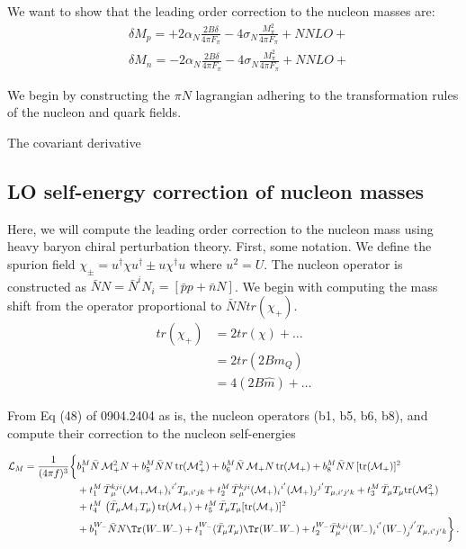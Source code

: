 \documentclass[12pt,tightenlines, raggedbottom, prd, notitlepage]{revtex4-1}
\def\mc#1{{\mathcal #1}}
\def\tr{\text{tr}}
\begin{document}
We want to show that the leading order correction to the nucleon masses are:
\begin{align*}
 &\delta M_p =  +2\alpha_N \frac{2B\delta}{4\pi F_\pi} - 4\sigma_N \frac{M^2_\pi}{4\pi F_\pi} + NNLO+ \\
 &\delta M_n = -2\alpha_N \frac{2B\delta}{4\pi F_\pi} - 4\sigma_N \frac{M^2_\pi}{4\pi F_\pi} + NNLO+
\end{align*}

We begin by constructing the $\pi N$ lagrangian adhering to the transformation rules
of the nucleon and quark fields. 

The covariant derivative 




\subsection*{LO self-energy correction of nucleon masses}

Here, we will compute the leading order correction to the nucleon mass using heavy baryon chiral perturbation theory. First, some notation. We define the spurion field $\chi_{\pm} = u^{\dagger}\chi u^{\dagger} \pm u\chi^{\dagger}u$ where $u^2 = U$.
The nucleon operator is constructed as $\bar{N}N = \bar{N}^iN_i = [\bar{p}p + \bar{n}N]$. We begin with computing the mass shift from the 
operator proportional to $\bar{N}Ntr(\chi_+)$. 
\begin{align*}
tr(\chi_+) &= 2tr(\chi) + \dots \\
&= 2tr(2Bm_Q) \\
&= 4(2B\hat{m}) + \dots
\end{align*}




From Eq (48) of 0904.2404 as is, 
the nucleon operators (b1, b5, b6, b8), and compute their correction to the nucleon self-energies

\begin{align}
  \mc{L}_M = \frac{1}{(4\pi f)^3} \bigg\{&
    b_1^M \bar{N}  \, \mc{M}_+^2  N
      + b_5^M \bar{N} N \, \tr ( \mc{M}_+^2 )
      + b_6^M \bar{N} \, \mc{M}_+ N \, \tr (\mc{M}_+) 
      + b_8^M \bar{N} N \, [\tr (\mc{M}_+)]^2
  \nonumber\\&
    + t_1^M \, \bar{T} {}^{kji}_\mu (\mc{M}_+ \mc{M}_+)_{i}{}^{i'} T_{\mu, i'jk} 
    + t_2^M  \, \bar{T} {}^{kji}_\mu (\mc{M}_+)_{i}{}^{i'} (\mc{M}_+)_{j}{}^{j'} T_{\mu, i'j'k} 
    + t_3^M  \, \bar{T}_\mu T_\mu \tr (\mc{M}_+^2)
  \nonumber\\&			
    + t_4^M \, \left( \bar{T}_\mu \mc{M}_+ T_\mu \right) \tr (\mc{M}_+)
    + t_5^M  \, \bar{T}_\mu T_\mu  [ \tr(\mc{M}_+) ]^2
  \nonumber\\&
    +b_1^{W_-} \bar{N} N \Tr (W_- W_-)
    +t_1^{W_-} (\bar{T}_\mu T_\mu) \Tr (W_- W_-)
    +t_2^{W_-} \bar{T}^{kji}_\mu (W_-)_{i}^{\ i^\prime} (W_-)_{j}^{\ j^\prime} T_{\mu, i^\prime j^\prime k}
    \bigg\}\, .
  \end{align}
\end{document}
